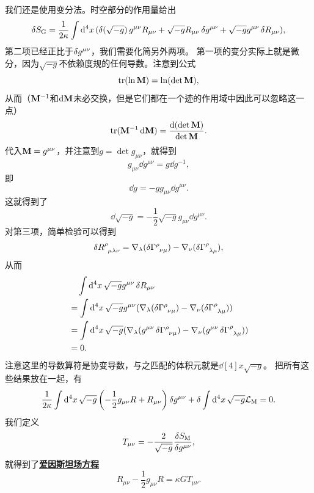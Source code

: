 \documentclass[hyperref, UTF8, a4paper]{ctexart}
\newcommand*{\concept}[1]{\underline{\textbf{#1}}}
\begin{document}
我们还是使用变分法。时空部分的作用量给出
\[
    \var{S_\text{G}} = \frac{1}{2 \kappa} \int \dd[4]{x} (\var{(\sqrt{-g})} g^{\mu \nu} R_{\mu \nu} + \sqrt{-g} R_{\mu \nu} \var{g^{\mu \nu}} + \sqrt{-g} g^{\mu \nu} \var{R_{\mu \nu}}),
\]
第二项已经正比于$\var{g^{\mu \nu}}$，我们需要化简另外两项。
第一项的变分实际上就是微分，因为$\sqrt{-g}$不依赖度规的任何导数。注意到公式
\[
    \trace(\ln \vb{M}) = \ln(\det \vb{M}),
\]
从而（$\vb{M}^{-1}$和$\dd{\vb{M}}$未必交换，但是它们都在一个迹的作用域中因此可以忽略这一点）
\[
    \trace (\vb{M}^{-1} \dd{\vb{M}}) = \frac{\dd{(\det \vb{M})}}{\det\vb{M}}.
\]
代入$\vb{M}=g^{\mu \nu}$，并注意到$g = \det g_{\mu \nu}$，就得到
\begin{equation}
    g_{\mu \nu} \dd{g^{\mu \nu}} = g \dd{g^{-1}},
\end{equation}
即
\begin{equation}
    \dd{g} = - g g_{\mu \nu} \dd{g^{\mu \nu}}. 
\end{equation}
这就得到了
\begin{equation}
    \dd{\sqrt{-g}} = - \frac{1}{2} \sqrt{-g} g_{\mu \nu} \dd{g^{\mu \nu}}.
\end{equation}
对第三项，简单检验可以得到
\[
    \var{R\indices{^\rho_{\mu \lambda \nu}}} = \nabla_\lambda (\var{\Gamma\indices{^\rho_{\nu \mu}}}) - \nabla_\nu (\var{\Gamma\indices{^\rho_{\lambda \mu}}}),
\]
从而
\[
    \begin{aligned}
        &\quad \int \dd[4]{x} \sqrt{-g} g^{\mu \nu} \var{R_{\mu \nu}} \\ 
        &= \int \dd[4]{x} \sqrt{-g} g^{\mu \nu} (\nabla_\lambda (\var{\Gamma\indices{^\rho_{\nu \mu}}}) - \nabla_\nu (\var{\Gamma\indices{^\rho_{\lambda \mu}}})) \\
        &= \int \dd[4]{x} \sqrt{-g} (\nabla_\lambda (g^{\mu \nu} \var{\Gamma\indices{^\rho_{\nu \mu}}}) - \nabla_\nu (g^{\mu \nu} \var{\Gamma\indices{^\rho_{\lambda \mu}}})) \\
        &= 0.
    \end{aligned}
\]
注意这里的导数算符是协变导数，与之匹配的体积元就是$\dd[4]{x} \sqrt{-g}$。
把所有这些结果放在一起，有
\[
    \frac{1}{2\kappa} \int \dd[4]{x} \sqrt{-g} \left( - \frac{1}{2} g_{\mu \nu} R + R_{\mu \nu} \right) \var{g^{\mu \nu}} + \var{\int \dd[4]{x} \sqrt{-g} \mathcal{L}_\text{M}} = 0.
\]
我们定义
\begin{equation}
    T_{\mu \nu} = - \frac{2}{\sqrt{-g}} \fdv{S_\text{M}}{g^{\mu \nu}},
\end{equation}
就得到了\concept{爱因斯坦场方程}
\begin{equation}
    R_{\mu \nu} - \frac{1}{2} g_{\mu \nu} R = \kappa G T_{\mu \nu}.
    \label{eq:einstein-eq}
\end{equation}
\end{document}
